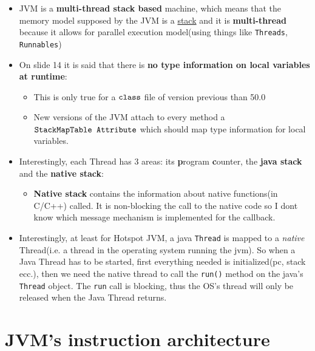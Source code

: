 \documentclass[a4paper,10pt]{article}
\begin{document}
\begin{itemize}

    \item JVM is a \textbf{multi-thread stack based} machine, which means that the memory model supposed by the JVM is a \underline{stack} and it is \textbf{multi-thread} because it allows for parallel execution model(using things like \verb|Threads|, \verb|Runnables|)

    \item On slide 14 it is said that there is \textbf{no type information on local variables at runtime}: 
     \begin{itemize}
        \item This is only true for a $\verb|class|$ file of version previous than 50.0
        \item New versions of the JVM attach to every method a $\verb|StackMapTable Attribute|$ which should map type information for local variables.
     \end{itemize}
     
     \item Interestingly, each Thread has 3 areas: its \textbf{p}rogram \textbf{c}ounter, the \textbf{java stack} and the \textbf{native stack}:
     \begin{itemize}
        \item \textbf{Native stack} contains the information about native functions(in C/C++) called. It is non-blocking the call to the native code so I dont know which message mechanism is implemented for the callback.
     \end{itemize} 
     
     \item Interestingly, at least for Hotspot JVM, a java \verb|Thread| is mapped to a \textit{native} Thread(i.e. a thread in the operating system running the jvm). So when a Java Thread has to be started, first everything needed is initialized(pc, stack ecc.), then we need the native thread to call the \verb|run()| method on the java's \verb|Thread| object. The \verb|run| call is blocking, thus the OS's thread will only be released when the Java Thread returns.
          
\end{itemize}

\section{JVM's instruction architecture}
\end{document}
